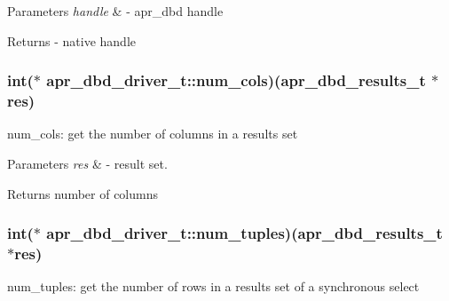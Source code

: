 \begin{DoxyParams}{Parameters}
{\em handle} & -\/ apr\-\_\-dbd handle \\
\hline
\end{DoxyParams}
\begin{DoxyReturn}{Returns}
-\/ native handle 
\end{DoxyReturn}
\hypertarget{structapr__dbd__driver__t_ab71099e0877a99b7743f70b927f44353}{
\subsubsection[{num\-\_\-cols}]{\setlength{\rightskip}{0pt plus 5cm}int($\ast$ apr\-\_\-dbd\-\_\-driver\-\_\-t\-::num\-\_\-cols)(apr\-\_\-dbd\-\_\-results\-\_\-t $\ast$res)}}\label{structapr__dbd__driver__t_ab71099e0877a99b7743f70b927f44353}
num\-\_\-cols\-: get the number of columns in a results set


\begin{DoxyParams}{Parameters}
{\em res} & -\/ result set. \\
\hline
\end{DoxyParams}
\begin{DoxyReturn}{Returns}
number of columns 
\end{DoxyReturn}
\hypertarget{structapr__dbd__driver__t_a8e307da83a358c169706ea9154f58f22}{
\subsubsection[{num\-\_\-tuples}]{\setlength{\rightskip}{0pt plus 5cm}int($\ast$ apr\-\_\-dbd\-\_\-driver\-\_\-t\-::num\-\_\-tuples)(apr\-\_\-dbd\-\_\-results\-\_\-t $\ast$res)}}\label{structapr__dbd__driver__t_a8e307da83a358c169706ea9154f58f22}
num\-\_\-tuples\-: get the number of rows in a results set of a synchronous select


